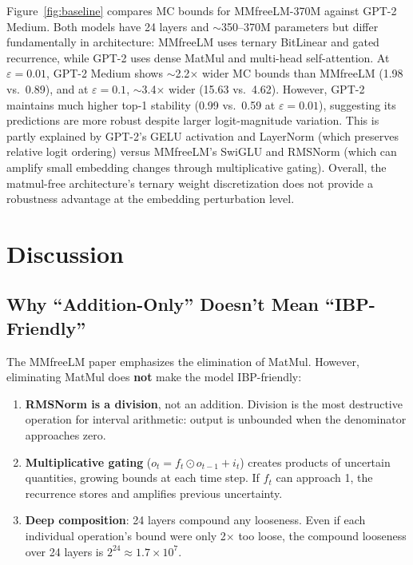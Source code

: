 \documentclass[11pt]{article}
\begin{document}
Figure~\ref{fig:baseline} compares MC bounds for MMfreeLM-370M against GPT-2 Medium. Both models have 24 layers and $\sim$350--370M parameters but differ fundamentally in architecture: MMfreeLM uses ternary BitLinear and gated recurrence, while GPT-2 uses dense MatMul and multi-head self-attention. At $\varepsilon{=}0.01$, GPT-2 Medium shows $\sim$2.2$\times$ wider MC bounds than MMfreeLM (1.98 vs.\ 0.89), and at $\varepsilon{=}0.1$, $\sim$3.4$\times$ wider (15.63 vs.\ 4.62). However, GPT-2 maintains much higher top-1 stability (0.99 vs.\ 0.59 at $\varepsilon{=}0.01$), suggesting its predictions are more robust despite larger logit-magnitude variation. This is partly explained by GPT-2's GELU activation and LayerNorm (which preserves relative logit ordering) versus MMfreeLM's SwiGLU and RMSNorm (which can amplify small embedding changes through multiplicative gating). Overall, the matmul-free architecture's ternary weight discretization does not provide a robustness advantage at the embedding perturbation level.

\section{Discussion}

\subsection{Why ``Addition-Only'' Doesn't Mean ``IBP-Friendly''}

The MMfreeLM paper emphasizes the elimination of MatMul. However, eliminating MatMul does \textbf{not} make the model IBP-friendly:

\begin{enumerate}[nosep]
    \item \textbf{RMSNorm is a division}, not an addition. Division is the most destructive operation for interval arithmetic: output is unbounded when the denominator approaches zero.
    \item \textbf{Multiplicative gating} ($o_t = f_t \odot o_{t-1} + i_t$) creates products of uncertain quantities, growing bounds at each time step. If $f_t$ can approach 1, the recurrence stores and amplifies previous uncertainty.
    \item \textbf{Deep composition}: 24 layers compound any looseness. Even if each individual operation's bound were only 2$\times$ too loose, the compound looseness over 24 layers is $2^{24} \approx 1.7 \times 10^7$.
\end{enumerate}
\end{document}
